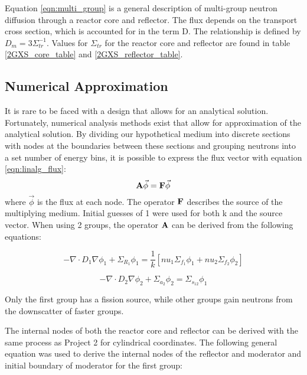 \documentclass[../main.tex]{subfiles}
\begin{document}
	Equation \ref{eqn:multi_group} is a general description of multi-group neutron diffusion through a reactor core and reflector. The flux depends on the transport cross section, which is accounted for in the term D.  The relationship is defined by $D_m = 3 \Sigma_{tr}^{-1}$. Values for $\Sigma_{tr}$ for the reactor core and reflector are found in table \ref{2GXS_core_table} and \ref{2GXS_reflector_table}. 

	
\subsection{Numerical Approximation} \label{ssec:numerical}
	It is rare to be faced with a design that allows for an analytical solution. Fortunately, numerical analysis methods exist that allow for approximation of the analytical solution. By dividing our hypothetical medium into discrete sections with nodes at the boundaries between these sections and grouping neutrons into a set number of energy bins, it is possible to express the flux vector with equation \ref{eqn:linalg_flux}:
	\begin{equation}
		\mathbf{A} \vec{\phi} = \mathbf{F} \vec{\phi}
		\label{eqn:linalg_flux}
	\end{equation}
	where $\vec{\phi}$ is the flux at each node. The operator $\mathbf{F}$ describes the source of the multiplying medium.  Initial guesses of 1 were used for both k and the source vector.  When using 2 groups, the operator $\mathbf{A}$ can be derived from the following equations:
	
	\begin{equation*}
		- \nabla \cdot D_{1} \nabla \phi_{1}+ \Sigma_{R_1} \phi_1 = \frac{1}{k} [nu_1 \Sigma_{f_1} \phi_{1} + nu_2 \Sigma_{f_2} \phi_{2}] 
	\end{equation*}
	
	\begin{equation*}
		- \nabla \cdot D_{2} \nabla \phi_{2}+ \Sigma_{a_2} \phi_2 = \Sigma_{s_{12}} \phi_1
	\end{equation*}

Only the first group has a fission source, while other groups gain neutrons from the downscatter of faster groups.

The internal nodes of both the reactor core and reflector can be derived with the same process as Project 2 for cylindrical coordinates.  The following general equation was used to derive the internal nodes of the reflector and moderator  and initial boundary of moderator for the first group:
\end{document}
